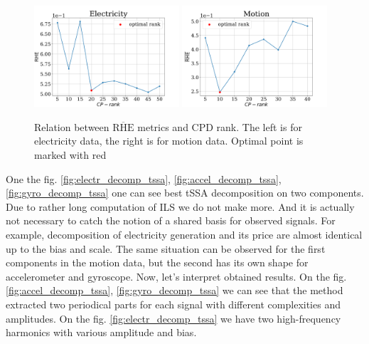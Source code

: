 \documentclass[referee, pdflatex]{sn-jnl}
\theoremstyle{definition}
\theoremstyle{plain}
\begin{document}
	\begin{figure}[h]
		\centering
		\includegraphics[width=0.48\textwidth, keepaspectratio]{../../experiments/electricity/tssa/figs/decomposition/RHE_mean.png}
		\includegraphics[width=0.48\textwidth, keepaspectratio]{../../experiments/motion/tssa/figs/decomposition/RHE_mean.png}
		\caption{Relation between $ \overline{\text{RHE}} $ metrics and CPD rank. The left is for electricity data, the right is for motion data. Optimal point is marked with red}\label{fig:decomp_rhe_rank}
	\end{figure}
	
	One the fig. \ref{fig:electr_decomp_tssa}, \ref{fig:accel_decomp_tssa}, \ref{fig:gyro_decomp_tssa} one can see best tSSA decomposition on two components. Due to rather long computation of ILS we do not make more. And it is actually not necessary to catch the notion of a shared basis for observed signals. For example, decomposition of electricity generation and its price are almost identical up to the bias and scale. The same situation can be observed for the first components in the motion data, but the second has its own shape for accelerometer and gyroscope. Now, let's interpret obtained results. On the fig. \ref{fig:accel_decomp_tssa}, \ref{fig:gyro_decomp_tssa} we can see that the method extracted two periodical parts for each signal with different complexities and amplitudes. On the fig. \ref{fig:electr_decomp_tssa} we have two high-frequency harmonics with various amplitude and bias.	
	
\end{document}
